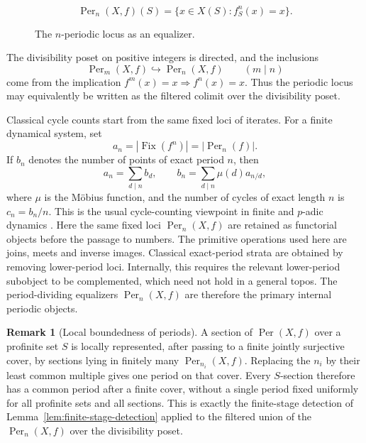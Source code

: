 \documentclass[10pt]{amsart}
\newcommand{\Fix}{\operatorname{Fix}}
\newcommand{\Per}{\operatorname{Per}}
\theoremstyle{plain}
\theoremstyle{definition}
\newtheorem{remark}[theorem]{Remark}
\begin{document}
\begin{figure}[htbp]
\centering
{}
\[
  \Per_n(X,f)(S)
  =
  \{x\in X(S):f_S^n(x)=x\}.
\]
\caption{The $n$-periodic locus as an equalizer.}
\label{fig:periodic-equalizer}
\end{figure}

The divisibility poset on positive integers is directed, and the inclusions
\[
  \Per_m(X,f)\hookrightarrow \Per_n(X,f)
  \qquad(m\mid n)
\]
come from the implication $f^m(x)=x\Rightarrow f^n(x)=x$. Thus the periodic
locus may equivalently be written as the filtered colimit over the divisibility
poset.

Classical cycle counts start from the same fixed loci of iterates. For a finite
dynamical system, set
\[
  a_n=|\Fix(f^n)|=|\Per_n(f)|.
\]
If $b_n$ denotes the number of points of exact period $n$, then
\[
  a_n=\sum_{d\mid n} b_d,
  \qquad
  b_n=\sum_{d\mid n}\mu(d)a_{n/d},
\]
where $\mu$ is the M\"obius function, and the number of cycles of exact length
$n$ is $c_n=b_n/n$. This is the usual
cycle-counting viewpoint in finite and $p$-adic dynamics
\cite{KhrennikovNilsonPadicDynamics,SilvermanADS}. Here the same fixed loci
$\Per_n(X,f)$ are retained as functorial objects before the passage to numbers.
The primitive operations used here are joins, meets and inverse images.
Classical exact-period strata are obtained by removing lower-period loci.
Internally, this requires the relevant lower-period subobject to be
complemented, which need not hold in a general topos. The period-dividing
equalizers $\Per_n(X,f)$ are therefore the primary internal periodic objects.

\begin{remark}[Local boundedness of periods]
A section of $\Per(X,f)$ over a profinite set $S$ is locally represented,
after passing to a finite jointly surjective cover, by sections lying in
finitely many $\Per_{n_i}(X,f)$. Replacing the $n_i$ by their least common
multiple gives one period on that cover. Every $S$-section therefore has a
common period after a finite cover, without a single period fixed uniformly for
all profinite sets and all sections. This is exactly the finite-stage detection of
Lemma~\ref{lem:finite-stage-detection} applied to the filtered union of the
$\Per_n(X,f)$ over the divisibility poset.
\end{remark}
\end{document}
